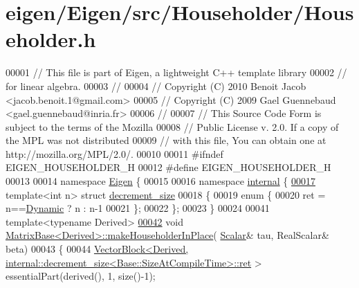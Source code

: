 \hypertarget{eigen_2_eigen_2src_2_householder_2_householder_8h_source}{}\section{eigen/\+Eigen/src/\+Householder/\+Householder.h}
\label{eigen_2_eigen_2src_2_householder_2_householder_8h_source}

\begin{DoxyCode}
00001 \textcolor{comment}{// This file is part of Eigen, a lightweight C++ template library}
00002 \textcolor{comment}{// for linear algebra.}
00003 \textcolor{comment}{//}
00004 \textcolor{comment}{// Copyright (C) 2010 Benoit Jacob <jacob.benoit.1@gmail.com>}
00005 \textcolor{comment}{// Copyright (C) 2009 Gael Guennebaud <gael.guennebaud@inria.fr>}
00006 \textcolor{comment}{//}
00007 \textcolor{comment}{// This Source Code Form is subject to the terms of the Mozilla}
00008 \textcolor{comment}{// Public License v. 2.0. If a copy of the MPL was not distributed}
00009 \textcolor{comment}{// with this file, You can obtain one at http://mozilla.org/MPL/2.0/.}
00010 
00011 \textcolor{preprocessor}{#ifndef EIGEN\_HOUSEHOLDER\_H}
00012 \textcolor{preprocessor}{#define EIGEN\_HOUSEHOLDER\_H}
00013 
00014 \textcolor{keyword}{namespace }\hyperlink{namespace_eigen}{Eigen} \{ 
00015 
00016 \textcolor{keyword}{namespace }\hyperlink{namespaceinternal}{internal} \{
\hyperlink{struct_eigen_1_1internal_1_1decrement__size}{00017} \textcolor{keyword}{template}<\textcolor{keywordtype}{int} n> \textcolor{keyword}{struct }\hyperlink{struct_eigen_1_1internal_1_1decrement__size}{decrement\_size}
00018 \{
00019   \textcolor{keyword}{enum} \{
00020     ret = n==\hyperlink{namespace_eigen_ad81fa7195215a0ce30017dfac309f0b2}{Dynamic} ? n : n-1
00021   \};
00022 \};
00023 \}
00024 
00041 \textcolor{keyword}{template}<\textcolor{keyword}{typename} Derived>
\hyperlink{group___core___module_aebf4bac7dffe2685ab93734fb776e817}{00042} \textcolor{keywordtype}{void} \hyperlink{group___core___module_aebf4bac7dffe2685ab93734fb776e817}{MatrixBase<Derived>::makeHouseholderInPlace}(
      \hyperlink{group___core___module_a5feed465b3a8e60c47e73ecce83e39a2}{Scalar}& tau, RealScalar& beta)
00043 \{
00044   \hyperlink{group___core___module_class_eigen_1_1_vector_block}{VectorBlock<Derived, internal::decrement\_size<Base::SizeAtCompileTime>::ret}
      > essentialPart(derived(), 1, size()-1);

\end{DoxyCode}
